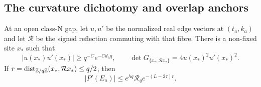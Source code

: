 \subsection{The curvature dichotomy and overlap anchors}

\begin{lemma}\label{lem:libanchors}
At an open class-N gap, let $u,u'$ be the normalized real edge
vectors at $(t_a,k_a)$ and let $\mathcal R$ be the signed reflection
commuting with that fibre. There is a non-fixed site $x_*$ such that
\begin{equation}\label{eq:libanchor}
 |u(x_*)u'(x_*)|\ge q^{-C}e^{-Cd_hq},\qquad
 \det G_{\{x_*,\mathcal Rx_*\}}=4u(x_*)^2u'(x_*)^2.
\end{equation}
If $r=\operatorname{dist}_{\mathbb Z/q\mathbb Z}(x_*,\mathcal Rx_*)\le q/2$, then
\begin{equation}\label{eq:libtunnel}
 |P'(E_a)|\le e^{hq}\mathcal R_q e^{-(L-2\tau)r}.
\end{equation}
\end{lemma}

